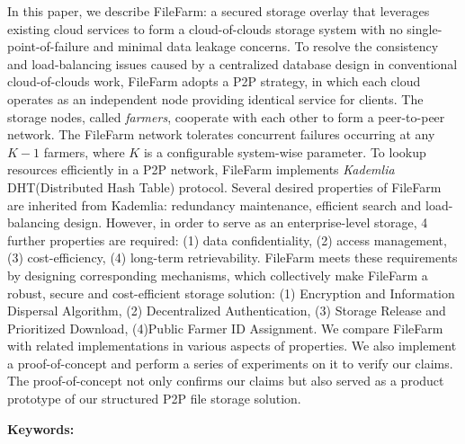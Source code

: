 \begin{abstracten}
  In this paper, we describe FileFarm: a secured storage overlay that leverages existing cloud services to form a cloud-of-clouds storage system with no single-point-of-failure and minimal data leakage concerns. To resolve the consistency and load-balancing issues caused by a centralized database design in conventional cloud-of-clouds work, FileFarm adopts a P2P strategy, in which each cloud operates as an independent node providing identical service for clients. The storage nodes, called \textit{farmers}, cooperate with each other to form a peer-to-peer network. The FileFarm network tolerates concurrent failures occurring at any $K-1$ farmers, where $K$ is a configurable system-wise parameter. To lookup resources efficiently in a P2P network, FileFarm implements \textit{Kademlia} DHT(Distributed Hash Table) protocol\cite{maymounkov2002kademlia}. Several desired properties of FileFarm are inherited from Kademlia: redundancy maintenance, efficient search and load-balancing design. However, in order to serve as an enterprise-level storage, 4 further properties are required: (1) data confidentiality, (2) access management, (3) cost-efficiency, (4) long-term retrievability. FileFarm meets these requirements by designing corresponding mechanisms, which collectively  make FileFarm a robust, secure and cost-efficient storage solution: (1) Encryption and Information Dispersal Algorithm, (2) Decentralized Authentication, (3) Storage Release and Prioritized Download, (4)Public Farmer ID Assignment. We compare FileFarm with related implementations in various aspects of properties. We also implement a proof-of-concept and perform a series of experiments on it to verify our claims.  The proof-of-concept not only confirms our claims but also served as a product prototype of our structured P2P file storage solution.

\bigbreak
\noindent \textbf{Keywords:}{\, \makeatletter \@keywordsen \makeatother}
\end{abstracten}
